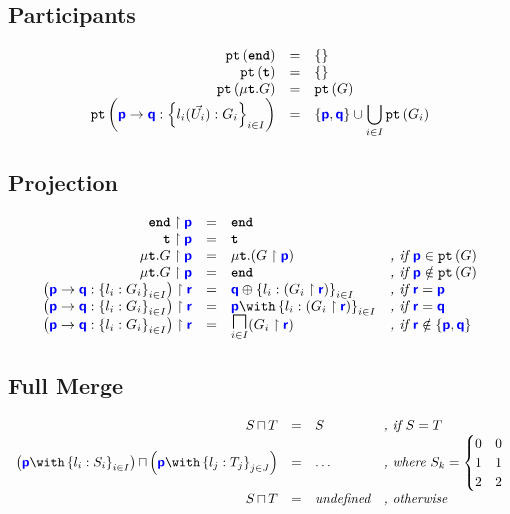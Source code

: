 \documentclass{article}
\begin{document}
\subsection{Participants}
\doublespacing
\[
\begin{array}{>{\displaystyle}r>{\displaystyle}c>{\displaystyle}l}
		\pt{\tyend} & = & \left\{\right\} \\
		\pt{\tyrecvar} & = & \left\{\right\} \\
		\pt{\tyrec{G}} & = & \pt{G} \\
		\pt{\gcomm{p}{q}{l_i(\vec{U_i}): G_i}{i \in I}} & = & \left\{\role{p},\role{q}\right\} \cup \bigcup_{i \in I}\pt{G_i} \\
\end{array}
\]
\singlespacing

\subsection{Projection}
\doublespacing
\[
\begin{array}{>{\displaystyle}r>{\displaystyle}c>{\displaystyle}l>{\displaystyle}l}
		\proj{\tyend}{p} & = & \tyend & \\
		\proj{\tyrecvar}{p} & = & \tyrecvar & \\
		\proj{\tyrec{G}}{p} & = & \tyrec{(\proj{G}{p})} & \textit{, if }\role{p} \in \pt{G}\\
		\proj{\tyrec{G}}{p} & = & \tyend & \textit{, if }\role{p} \notin \pt{G}\\
		\proj{\left(\gcomm{p}{q}{l_i: G_i}{i \in I}\right)}{r} & = & \tysel{q}{l_i: (\proj{G_i}{r})}{i \in I} & \textit{, if }\role{r} = \role{p} \\
		\proj{\left(\gcomm{p}{q}{l_i: G_i}{i \in I}\right)}{r} & = & \tybra{p}{l_i: (\proj{G_i}{r})}{i \in I} & \textit{, if }\role{r} = \role{q} \\
		\proj{\left(\gcomm{p}{q}{l_i: G_i}{i \in I}\right)}{r} & = & \underset{i \in I}{\tyMERGEOP}{(\proj{G_i}{r})} & \textit{, if }\role{r} \notin \left\{\role{p},\role{q}\right\}
\end{array}
\]
\singlespacing

\subsection{Full Merge}
\doublespacing
\[
\begin{array}{>{\displaystyle}r>{\displaystyle}c>{\displaystyle}ll}
		\tymerge{S}{T} & = & S & \textit{, if $S = T$} \\
		\tymerge{\left(\tybra{p}{l_i: S_i}{i \in I}\right)}{\left(\tybra{p}{l_j: T_j}{j \in J}\right)} & = & \dots & \textit{, where } S_k = \begin{cases}
0 & 0 \\
1 & 1 \\
2 & 2
\end{cases} \\
		\tymerge{S}{T} & = & \textit{undefined} & \textit{, otherwise}\\
\end{array}
\]
\singlespacing
\end{document}
